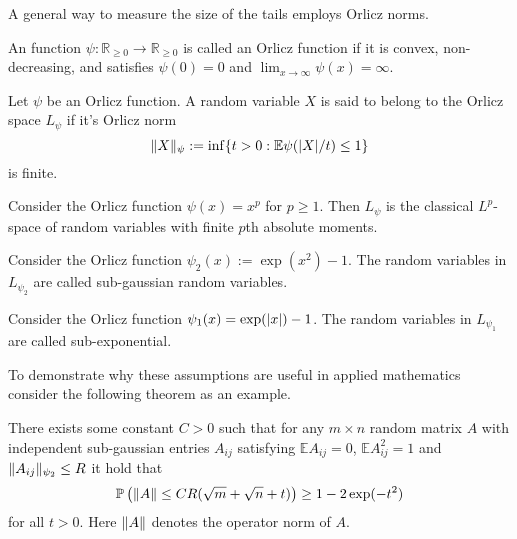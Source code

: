 A general way to measure the size of the tails employs Orlicz norms.
\begin{definition}
  An function $\psi:\mathbb{R}_{\geq 0}\to \mathbb{R}_{\geq 0}$ is called an Orlicz function if it is convex, non-decreasing, and satisfies $\psi(0)= 0$ and $\lim_{x\to \infty}\psi(x) = \infty$.
\end{definition}
\begin{definition}
  Let $\psi$ be an Orlicz function. A random variable $X$ is said to belong to the Orlicz space $L_\psi$ if it's Orlicz norm
  $$\Vert X \Vert_{\psi} := \inf\{t>0: \mathbb{E}\psi(\vert X \vert/t)\leq 1\}$$
  is finite.
\end{definition}
\begin{example}
  Consider the Orlicz function $\psi(x) = x^p$ for $p\geq 1$.
  Then $L_\psi$ is the classical $L^p$-space of random variables with finite $p$th absolute moments.
\end{example}
\begin{example}
  Consider the Orlicz function $\psi_2(x):= \exp(x^2)-1$.
  The random variables in $L_{\psi_2}$ are called sub-gaussian random variables.
\end{example}
\begin{example}
  Consider the Orlicz function $\psi_1(x) = \exp(\vert x \vert)-1$.
  The random variables in $L_{\psi_1}$ are called sub-exponential.
\end{example}
To demonstrate why these assumptions are useful in applied mathematics consider the following theorem as an example.
\begin{theorem}{\cite[Theorem 4.4.5]{vershynin2018high}}
  There exists some constant $C>0$ such that for any  $m\times n$ random matrix $A$ with independent sub-gaussian entries $A_{ij}$ satisfying $\mathbb{E}A_{ij} = 0$, $\mathbb{E}A_{ij}^2 = 1$ and $\Vert A_{ij} \Vert_{\psi_2}\leq R$
  it hold that
  $$\mathbb{P}\left(\Vert A \Vert \leq  CR(\sqrt{m} + \sqrt{n} + t)\right) \geq 1-2\exp(-t^2)$$
  for all $t>0$.
  Here $\Vert A \Vert$ denotes the operator norm of $A$.
\end{theorem}
